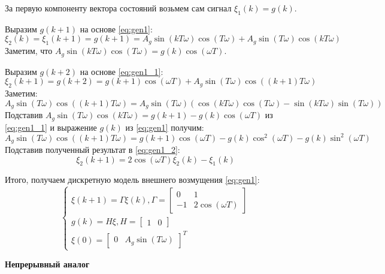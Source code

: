 \documentclass[a4paper, 14pt]{extarticle}
\theoremstyle{definition}
\theoremstyle{plain}
\theoremstyle{remark}
\begin{document}
За первую компоненту вектора состояний возьмем сам сигнал $\xi_1(k) = g(k)$.

Выразим $g(k+1)$ на основе \ref{eq:gen1}:
\begin{equation}\label{eq:gen1_1}
	\xi_2(k) =\xi_1(k+1)= g(k+1) = A_g\sin(kT\omega)\cos(T\omega) + A_g\sin(T\omega)\cos(kT\omega)
\end{equation}
Заметим, что $A_g\sin(kT\omega)\cos(T\omega) = g(k)\cos(\omega T)$.

Выразим $g(k+2)$ на основе \ref{eq:gen1_1}:
\begin{equation} \label{eq:gen1_2}
	\xi_2(k+1)=g(k+2) = g(k+1)\cos(\omega T) + A_g\sin(T\omega)\cos((k+1)T\omega)
\end{equation}
Заметим:
\begin{equation*}
	A_g\sin(T\omega)\cos((k+1)T\omega) = A_g\sin(T\omega)(\cos(kT\omega)\cos(T\omega) - \sin(kT\omega)\sin(T\omega))
\end{equation*}
Подставив $A_g\sin(T\omega)\cos(kT\omega) = g(k+1)-g(k)\cos(\omega T)$ из \ref{eq:gen1_1} и выражение $g(k)$ из \ref{eq:gen1} получим:
\begin{equation*}
	A_g\sin(T\omega)\cos((k+1)T\omega) = g(k+1)\cos(\omega T) -g(k)\cos^2(\omega T) - g(k)\sin^2(\omega T)
\end{equation*}
Подставив полученный результат в \ref{eq:gen1_2}:
\begin{equation}
	\xi_2(k+1)= 2\cos(\omega T)\xi_2(k) - \xi_1(k)
\end{equation}

Итого, получаем дискретную модель внешнего возмущения \ref{eq:gen1}:
\begin{equation}\label{eq:gen1_sys}
	\begin{cases}
		\xi(k+1) = \Gamma\xi(k), \Gamma=\begin{bmatrix}
			0 & 1 \\ -1 & 2\cos(\omega T)
		\end{bmatrix} \\
		g(k) = H\xi, H = \begin{bmatrix}
			1 & 0
		\end{bmatrix} \\
		\xi(0) = \begin{bmatrix}
			0 & A_g\sin(T\omega)
		\end{bmatrix}^T
	\end{cases}
\end{equation}

\textbf{Непрерывный аналог}
\end{document}
